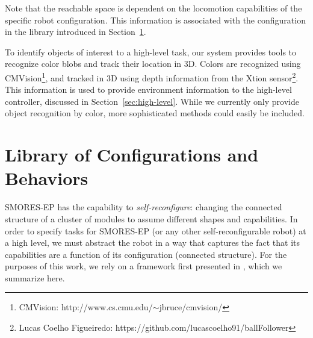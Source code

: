 \documentclass[conference]{IEEEtran}
\begin{document}
Note that the reachable space is dependent on the locomotion capabilities of the specific robot configuration. This information is associated with the configuration in the library introduced in Section~\ref{sec:configuration-specifics}.

To identify objects of interest to a high-level task, our system provides tools to recognize color blobs and track their location in 3D.  Colors are recognized using CMVision\footnote{CMVision: http://www.cs.cmu.edu/$\sim$jbruce/cmvision/}, and tracked in 3D using depth information from the Xtion sensor\footnote{Lucas Coelho Figueiredo: https://github.com/lucascoelho91/ballFollower}. This information is used to provide environment information to the high-level controller, discussed in Section~\ref{sec:high-level}.  While we currently only provide object recognition by color, more sophisticated methods could easily be included. 
%

\section{Library of Configurations and Behaviors}
\label{sec:configuration-specifics}
%
SMORES-EP has the capability to \emph{self-reconfigure}: changing the connected structure of a cluster of modules to assume different shapes and capabilities.  In order to specify tasks for SMORES-EP (or any other self-reconfigurable robot) at a high level, we must abstract the robot in a way that captures the fact that its capabilities are a function of its configuration (connected structure). For the purposes of this work, we rely on a framework first presented in \cite{Jing2016}, which we summarize here.
\end{document}
